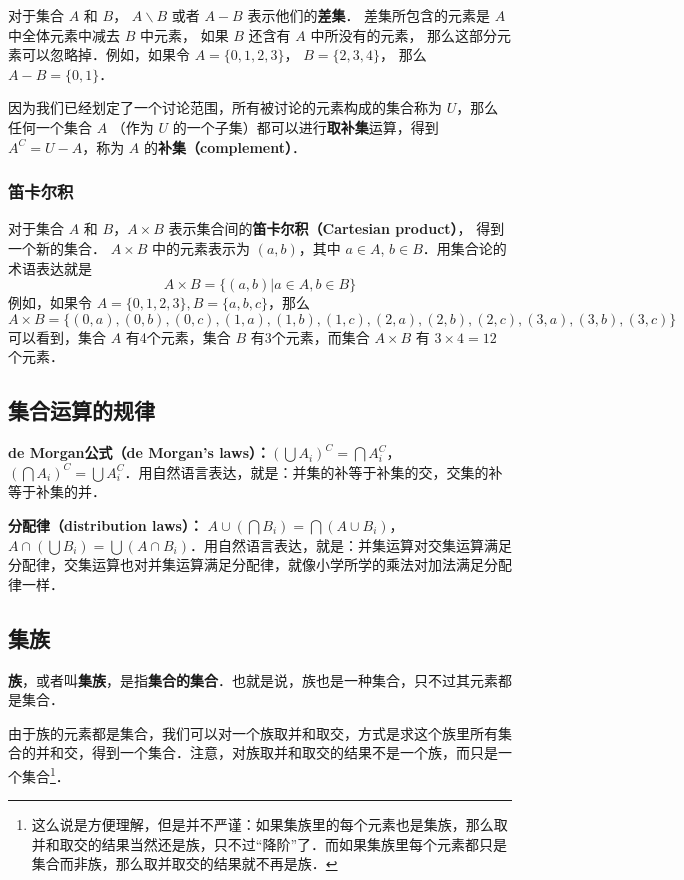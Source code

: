 对于集合 $A$ 和 $B$， $A\backslash B$ 或者 $A-B$ 表示他们的\textbf{差集}． 差集所包含的元素是 $A$ 中全体元素中减去 $B$ 中元素， 如果 $B$ 还含有 $A$ 中所没有的元素， 那么这部分元素可以忽略掉．例如，如果令 $A=\{0,1,2,3\}$， $B=\{2,3,4\}$， 那么 $A-B=\{0,1\}$．

因为我们已经划定了一个讨论范围，所有被讨论的元素构成的集合称为 $U$，那么任何一个集合 $A$ （作为 $U$ 的一个子集）都可以进行\textbf{取补集}运算，得到 $A^C=U-A$，称为 $A$ 的\textbf{补集（complement）}．

\subsubsection{笛卡尔积}
对于集合 $A$ 和 $B$，$A\times B$ 表示集合间的\textbf{笛卡尔积（Cartesian product）}， 得到一个新的集合． $A\times B$ 中的元素表示为 $(a,b)$，其中 $a\in A$, $b\in B$．用集合论的术语表达就是
\begin{equation}\label{Set_eq1}
A\times B=\{(a,b)|a\in A, b\in B\}
\end{equation}
例如，如果令 $A=\{0,1,2,3\}, B=\{a, b, c\}$，那么
\begin{equation}
A\times B=\{ (0,a),(0,b),(0,c),(1,a),(1,b),(1,c),(2,a),(2,b),(2,c),(3,a),(3,b),(3,c) \}
\end{equation}
可以看到，集合 $A$ 有4个元素，集合 $B$ 有3个元素，而集合 $A\times B$ 有 $3\times4 = 12$ 个元素．

\subsection{集合运算的规律}

\textbf{de Morgan公式（de Morgan's laws）：}$(\bigcup A_i)^C=\bigcap A_i^C$，$(\bigcap A_i)^C=\bigcup A_i^C$．用自然语言表达，就是：并集的补等于补集的交，交集的补等于补集的并．

\textbf{分配律（distribution laws）：} $A\cup(\bigcap B_i)=\bigcap (A\cup B_i)$，$A\cap(\bigcup B_i)=\bigcup (A\cap B_i)$．用自然语言表达，就是：并集运算对交集运算满足分配律，交集运算也对并集运算满足分配律，就像小学所学的乘法对加法满足分配律一样．


\subsection{集族}

\textbf{族}，或者叫\textbf{集族}，是指\textbf{集合的集合}．也就是说，族也是一种集合，只不过其元素都是集合．

由于族的元素都是集合，我们可以对一个族取并和取交，方式是求这个族里所有集合的并和交，得到一个集合．注意，对族取并和取交的结果不是一个族，而只是一个集合\footnote{这么说是方便理解，但是并不严谨：如果集族里的每个元素也是集族，那么取并和取交的结果当然还是族，只不过“降阶”了．而如果集族里每个元素都只是集合而非族，那么取并取交的结果就不再是族．}．

